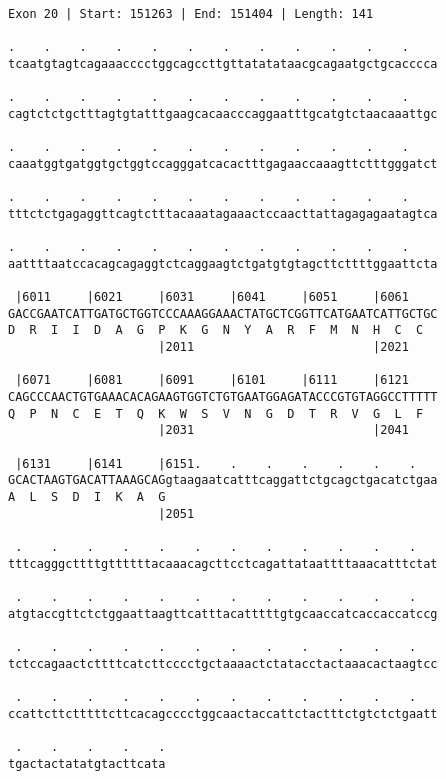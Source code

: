 \documentclass{article}
\begin{document}
\newpage
\begin{Verbatim}[fontfamily=courier]
Exon 20 | Start: 151263 | End: 151404 | Length: 141

.    .    .    .    .    .    .    .    .    .    .    .    
tcaatgtagtcagaaacccctggcagccttgttatatataacgcagaatgctgcacccca

.    .    .    .    .    .    .    .    .    .    .    .    
cagtctctgctttagtgtatttgaagcacaacccaggaatttgcatgtctaacaaattgc

.    .    .    .    .    .    .    .    .    .    .    .    
caaatggtgatggtgctggtccagggatcacactttgagaaccaaagttctttgggatct

.    .    .    .    .    .    .    .    .    .    .    .    
tttctctgagaggttcagtctttacaaatagaaactccaacttattagagagaatagtca

.    .    .    .    .    .    .    .    .    .    .    .    
aattttaatccacagcagaggtctcaggaagtctgatgtgtagcttcttttggaattcta

 |6011     |6021     |6031     |6041     |6051     |6061    
GACCGAATCATTGATGCTGGTCCCAAAGGAAACTATGCTCGGTTCATGAATCATTGCTGC
D  R  I  I  D  A  G  P  K  G  N  Y  A  R  F  M  N  H  C  C  
                     |2011                         |2021    

 |6071     |6081     |6091     |6101     |6111     |6121    
CAGCCCAACTGTGAAACACAGAAGTGGTCTGTGAATGGAGATACCCGTGTAGGCCTTTTT
Q  P  N  C  E  T  Q  K  W  S  V  N  G  D  T  R  V  G  L  F  
                     |2031                         |2041    

 |6131     |6141     |6151.    .    .    .    .    .    .   
GCACTAAGTGACATTAAAGCAGgtaagaatcatttcaggattctgcagctgacatctgaa
A  L  S  D  I  K  A  G                                      
                     |2051                                  

 .    .    .    .    .    .    .    .    .    .    .    .   
tttcagggcttttgttttttacaaacagcttcctcagattataattttaaacatttctat

 .    .    .    .    .    .    .    .    .    .    .    .   
atgtaccgttctctggaattaagttcatttacatttttgtgcaaccatcaccaccatccg

 .    .    .    .    .    .    .    .    .    .    .    .   
tctccagaactcttttcatcttcccctgctaaaactctatacctactaaacactaagtcc

 .    .    .    .    .    .    .    .    .    .    .    .   
ccattcttctttttcttcacagcccctggcaactaccattctactttctgtctctgaatt

 .    .    .    .    .
tgactactatatgtacttcata
\end{Verbatim}
\end{document}

